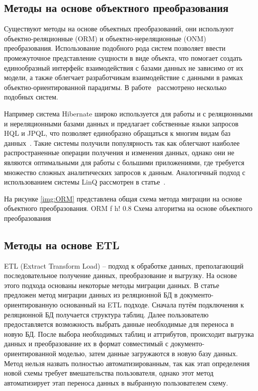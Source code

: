\clearpage

\subsection{Методы на основе объектного преобразования}
Существуют методы на основе объектных преобразований, они используют объектно-реляционные (ORM) и объектно-нереляционные (ONM) преобразования.
Использование подобного рода систем позволяет ввести промежуточное представление сущности в виде объекта,
что помогает создать единообразный интерфейс взаимодействия с базами данных не зависимо от их модели,
а также облегчает разработчикам взаимодействие с данными в рамках объектно-ориентированной парадигмы.
В работе~\cite{ONM} рассмотрено несколько подобных систем.

Например система Hibernate широко используется для работы и с реляционными и нереляционными базами данных и предлагает собственные языки запросов HQL и JPQL,
что позволяет единобразно обращаться к многим видам баз данных~\cite{hibernateogm}.
Такие системы получили популярность так как облегчают наиболее распространенные операции получения и изменения данных,
однако они не являются оптимальными для работы с большими приложениями,
где требуется множество сложных аналитических запросов к данным.
Аналогичный подход с использованием системы LinQ рассмотрен в статье~\cite{linq}.

На рисунке \ref{img:ORM} представлена общая схема метода миграции на основе объектного преобразования.
    {ORM} %
    {f} %
    {h!} %
    {0.8\textwidth} %
{Схема алгоритма на основе объектного преобразования} %

\clearpage

\subsection{Методы на основе ETL}
ETL (Extract Transform Load) -- подход к обработке данных, преполагающий последовательное получение данных, преобразование и выгрузку.
На основе этого подхода основаны некоторые методы миграции данных.
В статье~\cite{etl} предложен метод миграции данных из реляционной БД в документо-ориентированную основанный на ETL подходе.
Сначала путём подключения к реляционной БД получается структура таблиц.
Далее пользователю предоставляется возможность выбрать данные необходимые для переноса в новую БД.
После выбора необходимых таблиц и аттрибутов, происходит выгрузка данных и преобразование их в формат совместимый с документо-ориентированной моделью, затем данные загружаются в новую базу данных. 
Метод нельзя назвать полностью автоматизированным, так как этап определения новой схемы требует вмешательства пользователя, однако этот метод автоматизирует этап переноса данных в выбранную пользователем схему.

